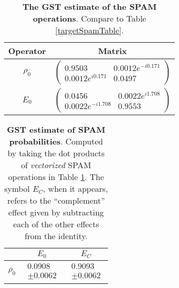 \documentclass{article}[11pt]
\begin{document}
\begin{table}[h]
\begin{center}
\begin{tabular}[l]{|c|c|}
\hline
Operator & Matrix \\ \hline
$\rho_{0}$ & $ \left(\!\!\begin{array}{cc}
0.9503 & 0.0012e^{-i0.171} \\ 
0.0012e^{i0.171} & 0.0497
 \end{array}\!\!\right) $
 \\ \hline
$E_{0}$ & $ \left(\!\!\begin{array}{cc}
0.0456 & 0.0022e^{i1.708} \\ 
0.0022e^{-i1.708} & 0.9553
 \end{array}\!\!\right) $
 \\ \hline
\end{tabular}

\caption{\textbf{The GST estimate of the SPAM operations}.  Compare to Table \ref{targetSpamTable}.\label{bestGatesetSpamTable}}
\end{center}
\end{table}

\begin{table}[h]
\begin{center}
\begin{tabular}[l]{|c|c|c|}
\hline
 & $E_{0}$ & $E_C$ \\ \hline
$\rho_{0}$ & $ \begin{array}{c} 0.0908 \\ \pm 0.0062 \end{array} $ & $ \begin{array}{c} 0.9093 \\ \pm 0.0062 \end{array} $ \\ \hline
\end{tabular}

\caption{\textbf{GST estimate of SPAM probabilities}.  Computed by taking the dot products of \emph{vectorized} SPAM operations in Table \ref{bestGatesetSpamTable}.  The symbol $E_C$, when it appears, refers to the ``complement'' effect given by subtracting each of the other effects from the identity.\label{bestGatesetSpamParametersTable}}
\end{center}
\end{table}
\end{document}
